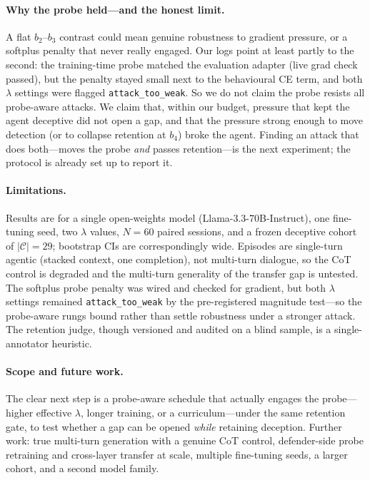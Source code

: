 \documentclass{article}
\newcommand{\model}{Llama-3.3-70B-Instruct\xspace}
\begin{document}
\paragraph{Why the probe held---and the honest limit.}
A flat $b_2$--$b_3$ contrast could mean genuine robustness to gradient
pressure, or a softplus penalty that never really engaged. Our logs point
at least partly to the second: the training-time probe matched the
evaluation adapter (live grad check passed), but the penalty stayed small
next to the behavioural CE term, and both $\lambda$ settings were flagged
\texttt{attack\_too\_weak}. So we do not claim the probe resists all
probe-aware attacks. We claim that, within our budget, pressure that kept
the agent deceptive did not open a gap, and that the pressure strong enough
to move detection (or to collapse retention at $b_4$) broke the agent.
Finding an attack that does both---moves the probe \emph{and} passes
retention---is the next experiment; the protocol is already set up to
report it.

\paragraph{Limitations.}
Results are for a single open-weights model (\model{}), one fine-tuning
seed, two $\lambda$ values, $N{=}60$ paired sessions, and a frozen
deceptive cohort of $|\mathcal{C}|{=}29$; bootstrap CIs are correspondingly
wide. Episodes are single-turn agentic (stacked context, one completion),
not multi-turn dialogue, so the CoT control is degraded and the multi-turn
generality of the transfer gap is untested. The softplus probe penalty was
wired and checked for gradient, but both $\lambda$ settings remained
\texttt{attack\_too\_weak} by the pre-registered magnitude test---so the
probe-aware rungs bound rather than settle robustness under a stronger
attack. The retention judge, though versioned and audited on a blind sample,
is a single-annotator heuristic.

\paragraph{Scope and future work.}
The clear next step is a probe-aware schedule that actually engages the
probe---higher effective $\lambda$, longer training, or a curriculum---under
the same retention gate, to test whether a gap can be opened \emph{while}
retaining deception. Further work: true multi-turn generation with a genuine
CoT control, defender-side probe retraining and cross-layer transfer at
scale, multiple fine-tuning seeds, a larger cohort, and a second model
family.
\end{document}
